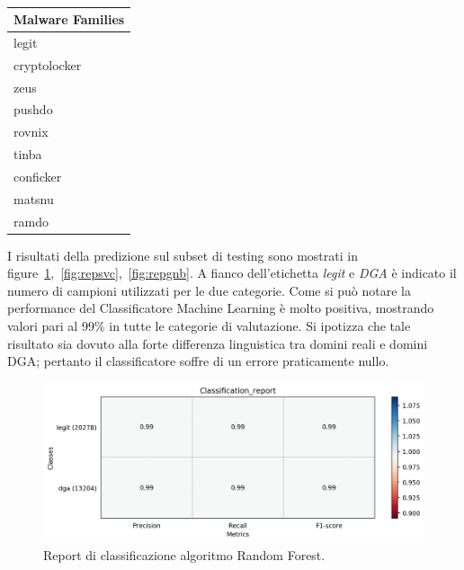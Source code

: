 \begin{table}[!bp]
    \centering
    \begin{tabular}[t]{l}
    \toprule
    Malware Families \\
    \midrule
	legit \\
	cryptolocker \\
	zeus \\
	pushdo \\
	rovnix \\
	tinba \\
	conficker \\
	matsnu \\
	ramdo \\
	\bottomrule
\end{tabular}
\caption{\label{tab:malware}}
\end{table}

I risultati della predizione sul subset di testing sono mostrati in figure~\ref{fig:repdga},~\ref{fig:repsvc},~\ref{fig:repgnb}. A fianco dell'etichetta \textit{legit} e \textit{DGA} è indicato il numero di campioni utilizzati per le due categorie. Come si può notare la performance del Classificatore Machine Learning è molto positiva, mostrando valori pari al 99\% in tutte le categorie di valutazione.  Si ipotizza che tale risultato sia dovuto alla forte differenza linguistica tra domini reali e domini DGA; pertanto il classificatore soffre di un errore praticamente nullo. 

\begin{figure}[!bp]
    \centering
    \includegraphics[width=\columnwidth]{figures/rndf_tra_nosup_nosup/class_rep.png}
    \caption{Report di classificazione algoritmo Random Forest.\label{fig:repdga}}
\end{figure}

